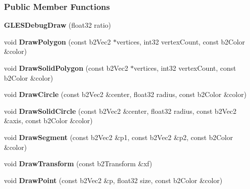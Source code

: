 \subsubsection*{Public Member Functions}
\begin{DoxyCompactItemize}
\item 
\hypertarget{class_g_l_e_s_debug_draw_a658e964ffb386b8b67fb5a3bc5db27a3}{{\bfseries G\-L\-E\-S\-Debug\-Draw} (float32 ratio)}\label{d7/da9/class_g_l_e_s_debug_draw_a658e964ffb386b8b67fb5a3bc5db27a3}

\item 
\hypertarget{class_g_l_e_s_debug_draw_afab4f8ea8882119f62134f9667e9e2da}{void {\bfseries Draw\-Polygon} (const b2\-Vec2 $\ast$vertices, int32 vertex\-Count, const b2\-Color \&color)}\label{d7/da9/class_g_l_e_s_debug_draw_afab4f8ea8882119f62134f9667e9e2da}

\item 
\hypertarget{class_g_l_e_s_debug_draw_aa68490f03cf0cb567ce6ccd78b18c5c3}{void {\bfseries Draw\-Solid\-Polygon} (const b2\-Vec2 $\ast$vertices, int32 vertex\-Count, const b2\-Color \&color)}\label{d7/da9/class_g_l_e_s_debug_draw_aa68490f03cf0cb567ce6ccd78b18c5c3}

\item 
\hypertarget{class_g_l_e_s_debug_draw_a9beacb1f221106e10ea68614ff336bf8}{void {\bfseries Draw\-Circle} (const b2\-Vec2 \&center, float32 radius, const b2\-Color \&color)}\label{d7/da9/class_g_l_e_s_debug_draw_a9beacb1f221106e10ea68614ff336bf8}

\item 
\hypertarget{class_g_l_e_s_debug_draw_ac06ea317fe6075cb9e1ff87ff89b8007}{void {\bfseries Draw\-Solid\-Circle} (const b2\-Vec2 \&center, float32 radius, const b2\-Vec2 \&axis, const b2\-Color \&color)}\label{d7/da9/class_g_l_e_s_debug_draw_ac06ea317fe6075cb9e1ff87ff89b8007}

\item 
\hypertarget{class_g_l_e_s_debug_draw_a2a24d1fe4eb99b6382380c234ab77382}{void {\bfseries Draw\-Segment} (const b2\-Vec2 \&p1, const b2\-Vec2 \&p2, const b2\-Color \&color)}\label{d7/da9/class_g_l_e_s_debug_draw_a2a24d1fe4eb99b6382380c234ab77382}

\item 
\hypertarget{class_g_l_e_s_debug_draw_a2306fb12b6f6e69d84fcb79bcddfcfbf}{void {\bfseries Draw\-Transform} (const b2\-Transform \&xf)}\label{d7/da9/class_g_l_e_s_debug_draw_a2306fb12b6f6e69d84fcb79bcddfcfbf}

\item 
\hypertarget{class_g_l_e_s_debug_draw_a84ce73b36e8b9e2843b2deacebeee839}{void {\bfseries Draw\-Point} (const b2\-Vec2 \&p, float32 size, const b2\-Color \&color)}\label{d7/da9/class_g_l_e_s_debug_draw_a84ce73b36e8b9e2843b2deacebeee839}


\end{DoxyCompactItemize}
